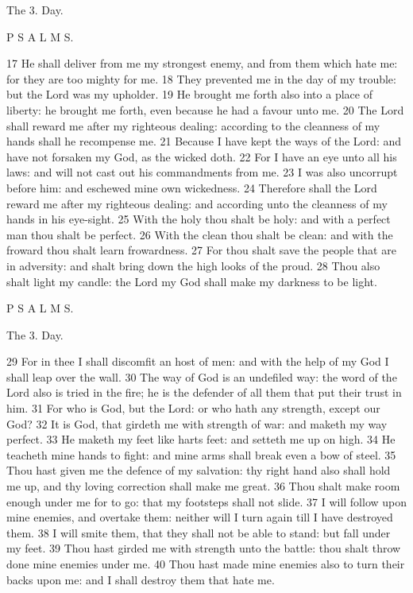 The 3. Day.

P S A L M S.

17 He shall deliver from me my strongest enemy, and from them which hate me: for they are too mighty for me. 18 They prevented me in the day of my trouble: but the Lord was my upholder. 19 He brought me forth also into a place of liberty: he brought me forth, even because he had a favour unto me. 20 The Lord shall reward me after my righteous dealing: according to the cleanness of my hands shall he recompense me. 21 Because I have kept the ways of the Lord: and have not forsaken my God, as the wicked doth. 22 For I have an eye unto all his laws: and will not cast out his commandments from me. 23 I was also uncorrupt before him: and eschewed mine own wickedness. 24 Therefore shall the Lord reward me after my righteous dealing: and according unto the cleanness of my hands in his eye-sight. 25 With the holy thou shalt be holy: and with a perfect man thou shalt be perfect. 26 With the clean thou shalt be clean: and with the froward thou shalt learn frowardness. 27 For thou shalt save the people that are in adversity: and shalt bring down the high looks of the proud. 28 Thou also shalt light my candle: the Lord my God shall make my darkness to be light.

P S A L M S.

The 3. Day.

29 For in thee I shall discomfit an host of men: and with the help of my God I shall leap over the wall. 30 The way of God is an undefiled way: the word of the Lord also is tried in the fire; he is the defender of all them that put their trust in him. 31 For who is God, but the Lord: or who hath any strength, except our God? 32 It is God, that girdeth me with strength of war: and maketh my way perfect. 33 He maketh my feet like harts feet: and setteth me up on high. 34 He teacheth mine hands to fight: and mine arms shall break even a bow of steel. 35 Thou hast given me the defence of my salvation: thy right hand also shall hold me up, and thy loving correction shall make me great. 36 Thou shalt make room enough under me for to go: that my footsteps shall not slide. 37 I will follow upon mine enemies, and overtake them: neither will I turn again till I have destroyed them. 38 I will smite them, that they shall not be able to stand: but fall under my feet. 39 Thou hast girded me with strength unto the battle: thou shalt throw done mine enemies under me. 40 Thou hast made mine enemies also to turn their backs upon me: and I shall destroy them that hate me.

